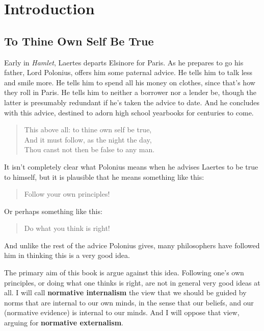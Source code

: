 \documentclass[
  10pt,
  letterpaper,
  twoside]{scrbook}
\begin{document}

\chapter{Introduction}\label{introduction}

\section{To Thine Own Self Be True}\label{tothineownselfbetrue}

Early in \emph{Hamlet}, Laertes departs Elsinore for Paris. As he
prepares to go his father, Lord Polonius, offers him some paternal
advice. He tells him to talk less and smile more. He tells him to spend
all his money on clothes, since that's how they roll in Paris. He tells
him to neither a borrower nor a lender be, though the latter is
presumably redundant if he's taken the advice to date. And he concludes
with this advice, destined to adorn high school yearbooks for centuries
to come.

\begin{quote}
This above all: to thine own self be true,\\
And it must follow, as the night the day,\\
Thou canst not then be false to any man.
\end{quote}

It isn't completely clear what Polonius means when he advises Laertes to
be true to himself, but it is plausible that he means something like
this:

\begin{quote}
Follow your own principles!
\end{quote}

Or perhaps something like this:

\begin{quote}
Do what you think is right!
\end{quote}

And unlike the rest of the advice Polonius gives, many philosophers have
followed him in thinking this is a very good idea.

The primary aim of this book is argue against this idea. Following one's
own principles, or doing what one thinks is right, are not in general
very good ideas at all. I will call \textbf{normative internalism} the
view that we should be guided by norms that are internal to our own
minds, in the sense that our beliefs, and our (normative evidence) is
internal to our minds. And I will oppose that view, arguing for
\textbf{normative externalism}.
\end{document}
